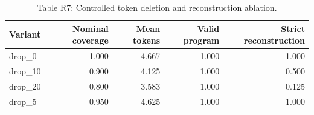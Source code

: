 \begin{table}[t]
\centering
\caption{Table R7: Controlled token deletion and reconstruction ablation.}
\begin{tabular}{lrrrr}
\toprule
Variant & Nominal coverage & Mean tokens & Valid program & Strict reconstruction \\
\midrule
drop\_0 & 1.000 & 4.667 & 1.000 & 1.000 \\
drop\_10 & 0.900 & 4.125 & 1.000 & 0.500 \\
drop\_20 & 0.800 & 3.583 & 1.000 & 0.125 \\
drop\_5 & 0.950 & 4.625 & 1.000 & 1.000 \\
\bottomrule
\end{tabular}
\end{table}
